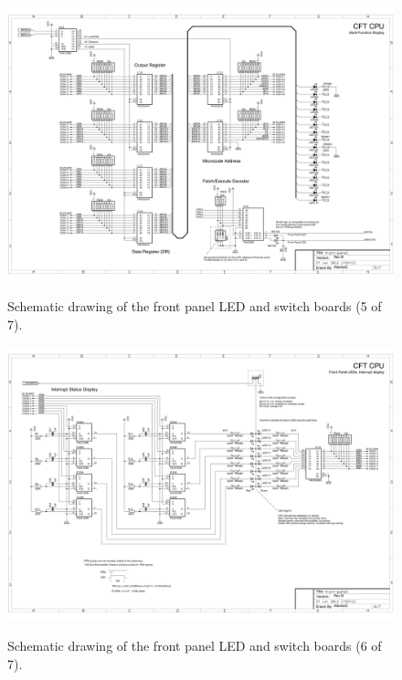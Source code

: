 \documentclass[11pt,a4paper,twocolumns]{article}
\begin{document}
\begin{figure}
\centering
\includegraphics[width=0.95\textheight,angle=90]{figs/front-panel-5.jpg}\\
\caption{\label{fig-schematic-front-panel-5}Schematic drawing of the front panel LED and switch boards (5 of 7).}
\end{figure}

\begin{figure}
\centering
\includegraphics[width=0.95\textheight,angle=90]{figs/front-panel-6.jpg}\\
\caption{\label{fig-schematic-front-panel-6}Schematic drawing of the front panel LED and switch boards (6 of 7).}
\end{figure}
\end{document}
